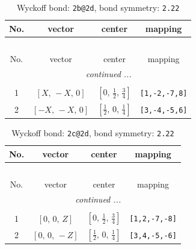 \documentclass[fleqn,8pt]{jsarticle}
\begin{document}
\renewcommand{\arraystretch}{1.2}
\begin{longtable}{cccc}
\caption{Wyckoff bond: {\tt 2b@2d}, bond symmetry: {\tt 2.22}}
 \\
 \hline \hline
No. & vector & center & mapping \\ \hline \endfirsthead

\multicolumn{3}{l}{\tablename\ \thetable{}} \\
 \hline \hline
No. & vector & center & mapping \\ \hline \endhead

 \hline \hline
\multicolumn{3}{r}{\footnotesize\it continued ...} \\ \endfoot

 \hline \hline
\multicolumn{3}{r}{} \\ \endlastfoot

1 & $\left[ X,\, - X,\, 0 \right]$ & $\left[ 0,\, \frac{1}{2},\, \frac{3}{4} \right]$ & {\tt [1,-2,-7,8]} \\ \hline
2 & $\left[ - X,\, - X,\, 0 \right]$ & $\left[ \frac{1}{2},\, 0,\, \frac{1}{4} \right]$ & {\tt [3,-4,-5,6]} \\
\end{longtable}
\renewcommand{\arraystretch}{1.2}
\begin{longtable}{cccc}
\caption{Wyckoff bond: {\tt 2c@2d}, bond symmetry: {\tt 2.22}}
 \\
 \hline \hline
No. & vector & center & mapping \\ \hline \endfirsthead

\multicolumn{3}{l}{\tablename\ \thetable{}} \\
 \hline \hline
No. & vector & center & mapping \\ \hline \endhead

 \hline \hline
\multicolumn{3}{r}{\footnotesize\it continued ...} \\ \endfoot

 \hline \hline
\multicolumn{3}{r}{} \\ \endlastfoot

1 & $\left[ 0,\, 0,\, Z \right]$ & $\left[ 0,\, \frac{1}{2},\, \frac{3}{4} \right]$ & {\tt [1,2,-7,-8]} \\ \hline
2 & $\left[ 0,\, 0,\, - Z \right]$ & $\left[ \frac{1}{2},\, 0,\, \frac{1}{4} \right]$ & {\tt [3,4,-5,-6]} \\
\end{longtable}
\renewcommand{\arraystretch}{1.2}
\end{document}
